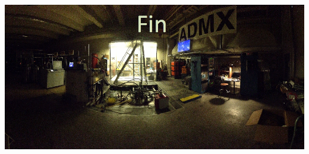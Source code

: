 \documentclass{beamer}
\begin{document}
\begin{frame}
\includegraphics[width=\textwidth]{dark_admx}
\end{frame}

%
%

%
\end{document}
